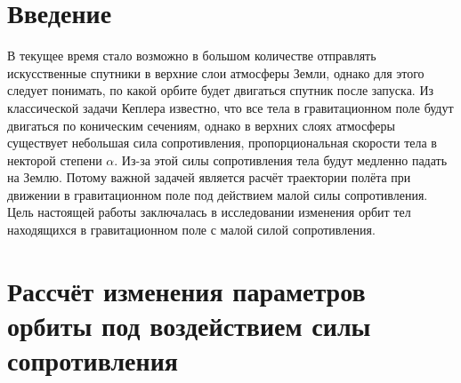\documentclass[12pt]{article}
\begin{document}
\section{Введение}
В текущее время стало возможно в большом количестве отправлять искусственные спутники в верхние слои атмосферы Земли, однако для этого следует 
понимать, по какой орбите будет двигаться спутник после запуска. Из классической задачи Кеплера известно, что все тела в 
гравитационном поле будут двигаться по коническим сечениям, однако в верхних слоях атмосферы существует небольшая сила сопротивления, 
пропорциональная скорости тела в некторой степени $\alpha$. Из-за этой силы сопротивления тела будут медленно падать на Землю. Потому 
важной задачей является расчёт траектории полёта при движении в гравитационном поле под действием малой силы сопротивления. 
Цель настоящей работы заключалась в исследовании изменения орбит тел находящихся в гравитационном поле с малой силой сопротивления.

\section{Рассчёт изменения параметров орбиты под воздействием силы сопротивления}
\end{document}

